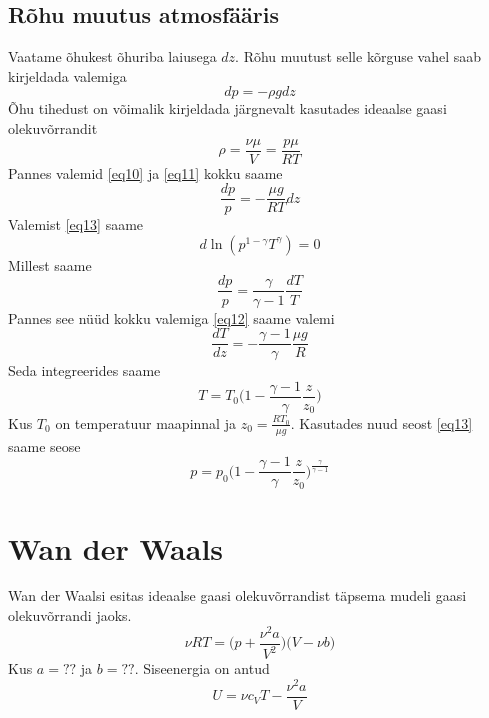 \documentclass{trkut}%
\begin{document}
\subsection{Rõhu muutus atmosfääris}
Vaatame õhukest õhuriba laiusega $dz$. Rõhu muutust selle kõrguse vahel saab kirjeldada valemiga
\begin{equation}\label{eq10}
dp=-\rho gdz
\end{equation}
Õhu tihedust on võimalik kirjeldada järgnevalt kasutades ideaalse gaasi olekuvõrrandit
\begin{equation}\label{eq11}
\rho = \frac{\nu \mu}{V} = \frac{p \mu}{RT}
\end{equation}
Pannes valemid \ref{eq10} ja \ref{eq11} kokku saame
\begin{equation}\label{eq12}
\frac{dp}{p} = -\frac{\mu g}{RT}dz
\end{equation}
Valemist \ref{eq13} saame
\begin{equation}
d\ln(p^{1-\gamma}T^\gamma) = 0
\end{equation}
Millest saame
\begin{equation}
\frac{dp}{p} = \frac{\gamma}{\gamma-1}\frac{dT}{T}
\end{equation}
Pannes see nüüd kokku valemiga \ref{eq12} saame valemi
\begin{equation}
\frac{dT}{dz}=-\frac{\gamma-1}{\gamma} \frac{\mu g}{R}
\end{equation}
Seda integreerides saame
\begin{equation}
T=T_0 \bigg( 1-\frac{\gamma-1}{\gamma} \frac{z}{z_0} \bigg)
\end{equation}
Kus $T_0$ on temperatuur maapinnal ja $z_0 = \frac{RT_0}{\mu g} $. Kasutades nuud seost \ref{eq13} saame seose
\begin{equation}
p = p_0 \bigg( 1-\frac{\gamma-1}{\gamma} \frac{z}{z_0} \bigg)^\frac{\gamma}{\gamma-1}
\end{equation}

\section{Wan der Waals}
Wan der Waalsi esitas ideaalse gaasi olekuvõrrandist täpsema mudeli gaasi olekuvõrrandi jaoks.
\begin{equation}\label{eq15}
\nu RT = \bigg( p+\frac{\nu^2 a}{V^2} \bigg) \bigg( V - \nu b \bigg)
\end{equation}
Kus $ a = ?? $ ja $ b = ??$. Siseenergia on antud
\begin{equation}\label{eq14}
U = \nu c_VT-\frac{\nu^2 a}{V}
\end{equation}
\end{document}
